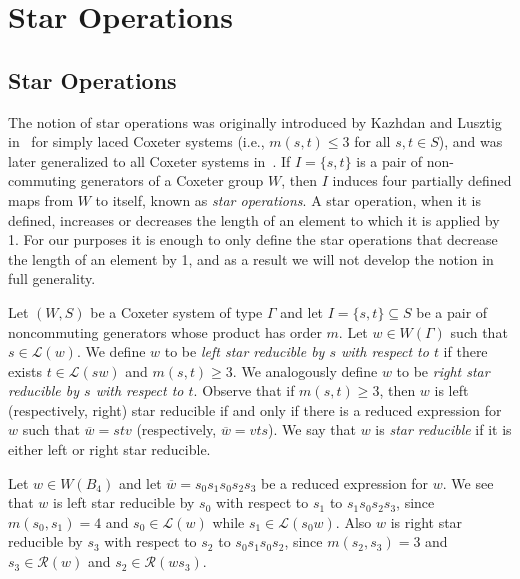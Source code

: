 \chapter{Star Operations}

\section{Star Operations}\label{Star}

The notion of star operations was originally introduced by Kazhdan and Lusztig in~\cite{Kazhdan1979} for simply laced Coxeter systems (i.e., $m(s,t) \leq 3$ for all $s,t \in S$), and was later generalized to all Coxeter systems in~\cite{Lusztig1985}. If $I=\{s,t\}$ is a pair of non-commuting generators of a Coxeter group $W$, then $I$ induces four partially defined maps from $W$ to itself, known as \emph{star operations}. A star operation, when it is defined, increases or decreases the length of an element to which it is applied by 1. For our purposes it is enough to only define the star operations that decrease the length of an element by 1, and as a result we will not develop the notion in full generality.

Let $(W,S)$ be a Coxeter system of type $\Gamma$ and let $I=\{s,t\}\subseteq S$ be a pair of noncommuting generators whose product has order $m$. Let $w \in W(\Gamma)$ such that $s \in \mathcal{L}(w)$. We define $w$ to be \emph{left star reducible by $s$ with respect to $t$} if there exists $t \in \mathcal{L}(sw)$ and $m(s,t) \geq 3$. We analogously define $w$ to be \emph{right star reducible by $s$ with respect to $t$}. Observe that if $m(s,t) \geq 3$, then $w$ is left (respectively, right) star reducible if and only if there is a reduced expression for $w$ such that $\overline{w}=stv$ (respectively, $\overline{w}=vts$). We say that $w$ is \emph{star reducible} if it is either left or right star reducible.

\begin{example}\label{ex:starred}
Let $w \in W(B_4)$ and let $\overline{w}=s_0s_1s_0s_2s_3$ be a reduced expression for $w$. We see that $w$ is left star reducible by $s_0$ with respect to $s_1$ to $s_1s_0s_2s_3$, since $m(s_0,s_1)=4$ and $s_0 \in \mathcal{L}(w)$ while $s_1 \in \mathcal{L}(s_0w)$. Also $w$ is right star reducible by $s_3$ with respect to $s_2$ to $s_0s_1s_0s_2$, since $m(s_2,s_3)=3$ and $s_3 \in \mathcal{R}(w)$ and $s_2 \in \mathcal{R}(ws_3)$.
\end{example}

